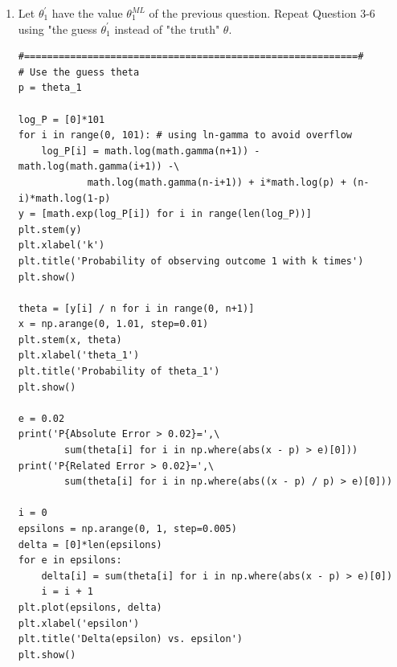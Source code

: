 \documentclass[preprint,12pt]{elsarticle}
\begin{document}
\begin{enumerate}
    \item Let $\theta_1^{'}$ have the value $\theta_1^{ML}$ of the previous
    question. Repeat Question 3-6 using "the guess $\theta_1^{'}$ instead
    of "the truth" $\theta$.
    \begin{lstlisting}
#==========================================================#
# Use the guess theta
p = theta_1

log_P = [0]*101
for i in range(0, 101): # using ln-gamma to avoid overflow
    log_P[i] = math.log(math.gamma(n+1)) - math.log(math.gamma(i+1)) -\
            math.log(math.gamma(n-i+1)) + i*math.log(p) + (n-i)*math.log(1-p)
y = [math.exp(log_P[i]) for i in range(len(log_P))]
plt.stem(y)
plt.xlabel('k')
plt.title('Probability of observing outcome 1 with k times')
plt.show()

theta = [y[i] / n for i in range(0, n+1)]
x = np.arange(0, 1.01, step=0.01)
plt.stem(x, theta)
plt.xlabel('theta_1')
plt.title('Probability of theta_1')
plt.show()

e = 0.02
print('P{Absolute Error > 0.02}=',\
        sum(theta[i] for i in np.where(abs(x - p) > e)[0]))
print('P{Related Error > 0.02}=',\
        sum(theta[i] for i in np.where(abs((x - p) / p) > e)[0]))

i = 0
epsilons = np.arange(0, 1, step=0.005)
delta = [0]*len(epsilons)
for e in epsilons:
    delta[i] = sum(theta[i] for i in np.where(abs(x - p) > e)[0])
    i = i + 1
plt.plot(epsilons, delta)
plt.xlabel('epsilon')
plt.title('Delta(epsilon) vs. epsilon')
plt.show()


\end{lstlisting}
\end{enumerate}
\end{document}
